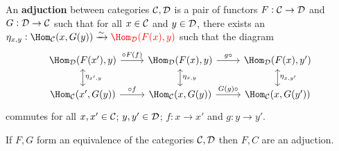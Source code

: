 \documentclass[../Year2.tex]{subfiles}
\begin{document}
\begin{definition}[Adjunction]
    An \textbf{adjuction} between categories $\mathcal{C},\mathcal{D}$ is a pair of functors $F:\mathcal{C}\rightarrow\mathcal{D}$ and $G:\mathcal{D}\rightarrow\mathcal{C}$ such that for all $x\in\mathcal{C}$ and $y\in\mathcal{D}$, there exists an $\eta_{x,y}:\Hom_\CCC(x,G(y))\xrightarrow{\sim}\textcolor{red}{\Hom_\DDD(F(x),y)}$ such that the diagram 
    \vspace{-10pt}
    \[
        \begin{tikzcd}
            \Hom_\DDD(F(x'),y) \arrow[d, leftrightarrow, "\eta_{x',y}"] \arrow[r, "\circ F(f)"] & 
            \Hom_\DDD(F(x),y) \arrow[d, leftrightarrow, "\eta_{x,y}"] \arrow[r, "g\circ"] & 
            \Hom_\DDD(F(x),y') \arrow[d, leftrightarrow, "\eta_{x,y'}"] \\
            \Hom_\CCC(x',G(y)) \arrow[r, "\circ f"] & 
            \Hom_\CCC(x,G(y)) \arrow[r, "G(g)\circ"] & 
            \Hom_\CCC(x,G(y'))
        \end{tikzcd}
    \] commutes for all $x,x'\in\mathcal{C}$; $y,y'\in\mathcal{D}$; $f:x\rightarrow x'$ and $g:y\rightarrow y'$.
\end{definition}

\begin{theorem}
    If $F,G$ form an equivalence of the categories $\mathcal{C},\mathcal{D}$ then $F,C$ are an adjuction.
\end{theorem}
\end{document}
